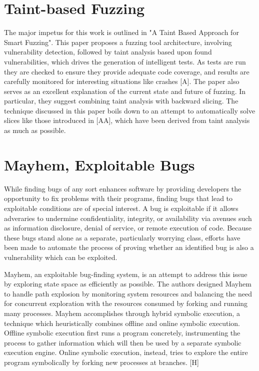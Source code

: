 \documentclass[11pt,expanded,copyright]{fsuthesis}
\begin{document}


\section{Taint-based Fuzzing}

The major impetus for this work is outlined in "A Taint Based Approach for Smart Fuzzing". This paper proposes a fuzzing tool architecture, involving vulnerability detection, followed by taint analysis based upon found vulnerabilities, which drives the generation of intelligent tests. As tests are run they are checked to ensure they provide adequate code coverage, and results are carefully monitored for interesting situations like crashes [A]. The paper also serves as an excellent explanation of the current state and future of fuzzing. In particular, they suggest combining taint analysis with backward slicing. The technique discussed in this paper boils down to an attempt to automatically solve slices like those introduced in [AA], which have been derived from taint analysis as much as possible.

\section{Mayhem, Exploitable Bugs}

While finding bugs of any sort enhances software by providing developers the opportunity to fix problems with their programs, finding bugs that lead to exploitable conditions are of special interest. A bug is exploitable if it allows adveraries to undermine confidentiality, integrity, or availability via avenues such as information disclosure, denial of service, or remote execution of code. Because these bugs stand alone as a separate, particularly worrying class, efforts have been made to automate the process of proving whether an identified bug is also a vulnerability which can be exploited.

Mayhem, an exploitable bug-finding system, is an attempt to address this issue by exploring state space as efficiently as possible. The authors designed Mayhem to handle path explosion by monitoring system resources and balancing the need for concurrent exploration with the resources consumed by forking and running many processes. Mayhem accomplishes through hybrid symbolic execution, a technique which heuristically combines offline and online symbolic execution. Offline symbolic execution first runs a program concretely, instrumenting the process to gather information which will then be used by a separate symbolic execution engine. Online symbolic execution, instead, tries to explore the entire program symbolically by forking new processes at branches. [H]
\end{document}
